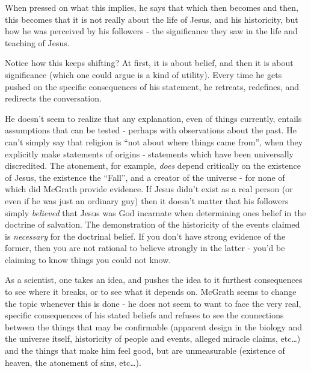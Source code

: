 
When pressed on what this implies, he says that 
which then becomes 
and then, this becomes that it is not really about the life of Jesus, and his historicity, but how he was perceived by his followers - the significance they saw in the life and teaching of Jesus.

Notice how this keeps shifting? At first, it is about belief, and then it is about significance (which one could argue is a kind of utility).  Every time he gets pushed on the
specific consequences of his statement, he retreats, redefines, and
redirects the conversation.

He doesn't seem to realize that any explanation, even of things
currently, entails assumptions that can be tested - perhaps with
observations about the past. He can't simply say that religion is ``not
about where things came from'', when they explicitly make statements of
origins - statements which have been universally discredited. The
atonement, for example, \emph{does} depend critically on the existence
of Jesus, the existence the ``Fall'', and a creator of the universe -
for none of which did McGrath provide evidence. If Jesus didn't exist as
a real person (or even if he was just an ordinary guy) then it doesn't
matter that his followers simply \emph{believed} that Jesus was God
incarnate when determining ones belief in the doctrine of salvation. The
demonstration of the historicity of the events claimed is
\emph{necessary} for the doctrinal belief. If you don't have strong
evidence of the former, then you are not rational to believe strongly in
the latter - you'd be claiming to know things you could not know.

As a scientist, one takes an idea, and pushes the idea to it furthest
consequences to see where it breaks, or to see what it depends on.
McGrath seems to change the topic whenever this is done - he does not seem to want to
face the very real, specific consequences of his stated beliefs and
refuses to see the connections between the things that may be
confirmable (apparent design in the biology and the universe itself,
historicity of people and events, alleged miracle claims, etc\ldots{})
and the things that make him feel good, but are unmeasurable (existence
of heaven, the atonement of sins, etc\ldots{}).


